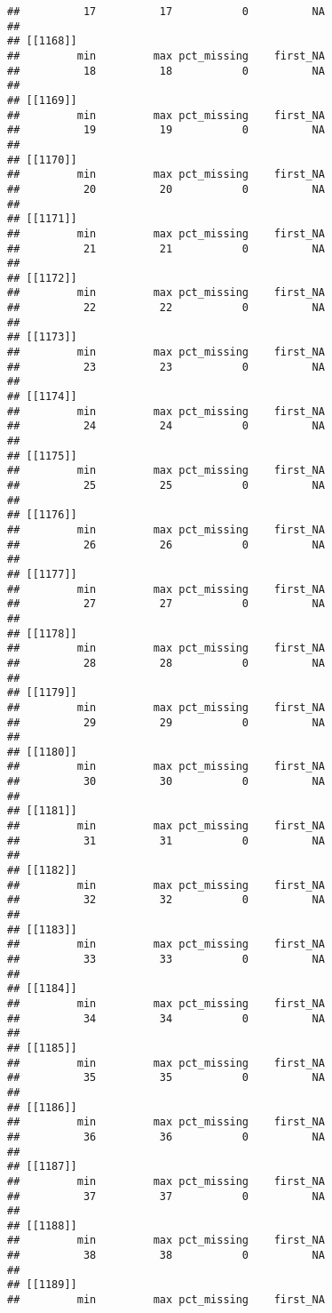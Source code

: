 \documentclass[
]{article}
\begin{document}
\begin{verbatim}
##          17          17           0          NA 
## 
## [[1168]]
##         min         max pct_missing    first_NA 
##          18          18           0          NA 
## 
## [[1169]]
##         min         max pct_missing    first_NA 
##          19          19           0          NA 
## 
## [[1170]]
##         min         max pct_missing    first_NA 
##          20          20           0          NA 
## 
## [[1171]]
##         min         max pct_missing    first_NA 
##          21          21           0          NA 
## 
## [[1172]]
##         min         max pct_missing    first_NA 
##          22          22           0          NA 
## 
## [[1173]]
##         min         max pct_missing    first_NA 
##          23          23           0          NA 
## 
## [[1174]]
##         min         max pct_missing    first_NA 
##          24          24           0          NA 
## 
## [[1175]]
##         min         max pct_missing    first_NA 
##          25          25           0          NA 
## 
## [[1176]]
##         min         max pct_missing    first_NA 
##          26          26           0          NA 
## 
## [[1177]]
##         min         max pct_missing    first_NA 
##          27          27           0          NA 
## 
## [[1178]]
##         min         max pct_missing    first_NA 
##          28          28           0          NA 
## 
## [[1179]]
##         min         max pct_missing    first_NA 
##          29          29           0          NA 
## 
## [[1180]]
##         min         max pct_missing    first_NA 
##          30          30           0          NA 
## 
## [[1181]]
##         min         max pct_missing    first_NA 
##          31          31           0          NA 
## 
## [[1182]]
##         min         max pct_missing    first_NA 
##          32          32           0          NA 
## 
## [[1183]]
##         min         max pct_missing    first_NA 
##          33          33           0          NA 
## 
## [[1184]]
##         min         max pct_missing    first_NA 
##          34          34           0          NA 
## 
## [[1185]]
##         min         max pct_missing    first_NA 
##          35          35           0          NA 
## 
## [[1186]]
##         min         max pct_missing    first_NA 
##          36          36           0          NA 
## 
## [[1187]]
##         min         max pct_missing    first_NA 
##          37          37           0          NA 
## 
## [[1188]]
##         min         max pct_missing    first_NA 
##          38          38           0          NA 
## 
## [[1189]]
##         min         max pct_missing    first_NA 

\end{verbatim}
\end{document}
